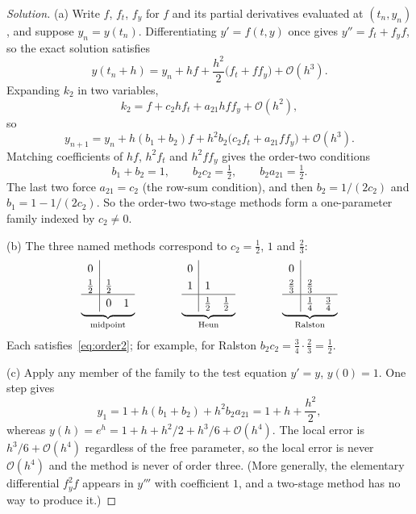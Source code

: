 \documentclass[11pt]{article}
\newcommand{\Oh}{\mathcal{O}}
\theoremstyle{definition}
\newenvironment{solution}{\begin{proof}[Solution]}{\end{proof}}
\begin{document}
\begin{solution}
(a) Write $f$, $f_t$, $f_y$ for $f$ and its partial derivatives evaluated at $(t_n, y_n)$, and suppose $y_n = y(t_n)$. Differentiating $y' = f(t,y)$ once gives $y'' = f_t + f_y f$, so the exact solution satisfies
\[
  y(t_n + h) = y_n + h f + \frac{h^2}{2}\bigl(f_t + f f_y\bigr) + \Oh(h^3).
\]
Expanding $k_2$ in two variables,
\[
  k_2 = f + c_2 h f_t + a_{21} h f f_y + \Oh(h^2),
\]
so
\[
  y_{n+1} = y_n + h (b_1 + b_2) f + h^2 b_2 \bigl(c_2 f_t + a_{21} f f_y\bigr) + \Oh(h^3).
\]
Matching coefficients of $h f$, $h^2 f_t$ and $h^2 f f_y$ gives the order-two conditions
\begin{equation}\label{eq:order2}
  b_1 + b_2 = 1, \qquad b_2 c_2 = \tfrac12, \qquad b_2 a_{21} = \tfrac12.
\end{equation}
The last two force $a_{21} = c_2$ (the row-sum condition), and then $b_2 = 1/(2c_2)$ and $b_1 = 1 - 1/(2c_2)$. So the order-two two-stage methods form a one-parameter family indexed by $c_2 \neq 0$.

(b) The three named methods correspond to $c_2 = \tfrac12$, $1$ and $\tfrac23$:
\[
  \renewcommand{\arraystretch}{1.25}
  \underbrace{\begin{array}{c|cc}
    0 & & \\
    \tfrac12 & \tfrac12 & \\ \hline
    & 0 & 1
  \end{array}}_{\text{midpoint}}
  \qquad\qquad
  \underbrace{\begin{array}{c|cc}
    0 & & \\
    1 & 1 & \\ \hline
    & \tfrac12 & \tfrac12
  \end{array}}_{\text{Heun}}
  \qquad\qquad
  \underbrace{\begin{array}{c|cc}
    0 & & \\
    \tfrac23 & \tfrac23 & \\ \hline
    & \tfrac14 & \tfrac34
  \end{array}}_{\text{Ralston}}
\]
Each satisfies~\eqref{eq:order2}; for example, for Ralston $b_2 c_2 = \tfrac34\cdot\tfrac23 = \tfrac12$.

(c) Apply any member of the family to the test equation $y' = y$, $y(0) = 1$. One step gives
\[
  y_1 = 1 + h(b_1 + b_2) + h^2 b_2 a_{21} = 1 + h + \frac{h^2}{2},
\]
whereas $y(h) = e^h = 1 + h + h^2/2 + h^3/6 + \Oh(h^4)$. The local error is $h^3/6 + \Oh(h^4)$ regardless of the free parameter, so the local error is never $\Oh(h^4)$ and the method is never of order three. (More generally, the elementary differential $f_y^2 f$ appears in $y'''$ with coefficient $1$, and a two-stage method has no way to produce it.)
\end{solution}
\end{document}
